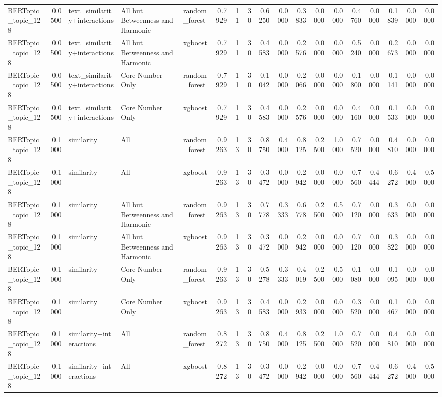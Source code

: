 \begin{tabular}{lrlllrrrrrrrrrrrrr}
BERTopic_topic_128 & 0.0500 & text_similarity+interactions & All but Betweenness and Harmonic & random_forest & 0.7929 & 11 & 30 & 0.6250 & 0.0000 & 0.3833 & 0.0000 & 0.0000 & 0.4760 & 0.0000 & 0.1839 & 0.0000 & 0.0000 \\
BERTopic_topic_128 & 0.0500 & text_similarity+interactions & All but Betweenness and Harmonic & xgboost & 0.7929 & 11 & 30 & 0.4583 & 0.0000 & 0.2576 & 0.0000 & 0.0000 & 0.5240 & 0.0000 & 0.2673 & 0.0000 & 0.0000 \\
BERTopic_topic_128 & 0.0500 & text_similarity+interactions & Core Number Only & random_forest & 0.7929 & 11 & 30 & 0.1042 & 0.0000 & 0.2066 & 0.0000 & 0.0000 & 0.1800 & 0.0000 & 0.1141 & 0.0000 & 0.0000 \\
BERTopic_topic_128 & 0.0500 & text_similarity+interactions & Core Number Only & xgboost & 0.7929 & 11 & 30 & 0.4583 & 0.0000 & 0.2576 & 0.0000 & 0.0000 & 0.4160 & 0.0000 & 0.1533 & 0.0000 & 0.0000 \\
BERTopic_topic_128 & 0.1000 & similarity & All & random_forest & 0.9263 & 13 & 30 & 0.8750 & 0.4000 & 0.8125 & 0.2500 & 1.0000 & 0.7520 & 0.0000 & 0.4810 & 0.0000 & 0.0000 \\
BERTopic_topic_128 & 0.1000 & similarity & All & xgboost & 0.9263 & 13 & 30 & 0.3472 & 0.0000 & 0.2942 & 0.0000 & 0.0000 & 0.7560 & 0.4444 & 0.6272 & 0.4000 & 0.5000 \\
BERTopic_topic_128 & 0.1000 & similarity & All but Betweenness and Harmonic & random_forest & 0.9263 & 13 & 30 & 0.7778 & 0.3333 & 0.6778 & 0.2500 & 0.5000 & 0.7120 & 0.0000 & 0.3633 & 0.0000 & 0.0000 \\
BERTopic_topic_128 & 0.1000 & similarity & All but Betweenness and Harmonic & xgboost & 0.9263 & 13 & 30 & 0.3472 & 0.0000 & 0.2942 & 0.0000 & 0.0000 & 0.7120 & 0.0000 & 0.3822 & 0.0000 & 0.0000 \\
BERTopic_topic_128 & 0.1000 & similarity & Core Number Only & random_forest & 0.9263 & 13 & 30 & 0.5278 & 0.3333 & 0.4019 & 0.2500 & 0.5000 & 0.1080 & 0.0000 & 0.1095 & 0.0000 & 0.0000 \\
BERTopic_topic_128 & 0.1000 & similarity & Core Number Only & xgboost & 0.9263 & 13 & 30 & 0.4583 & 0.0000 & 0.2933 & 0.0000 & 0.0000 & 0.3520 & 0.0000 & 0.1467 & 0.0000 & 0.0000 \\
BERTopic_topic_128 & 0.1000 & similarity+interactions & All & random_forest & 0.8272 & 13 & 30 & 0.8750 & 0.4000 & 0.8125 & 0.2500 & 1.0000 & 0.7520 & 0.0000 & 0.4810 & 0.0000 & 0.0000 \\
BERTopic_topic_128 & 0.1000 & similarity+interactions & All & xgboost & 0.8272 & 13 & 30 & 0.3472 & 0.0000 & 0.2942 & 0.0000 & 0.0000 & 0.7560 & 0.4444 & 0.6272 & 0.4000 & 0.5000 \\

\end{tabular}
